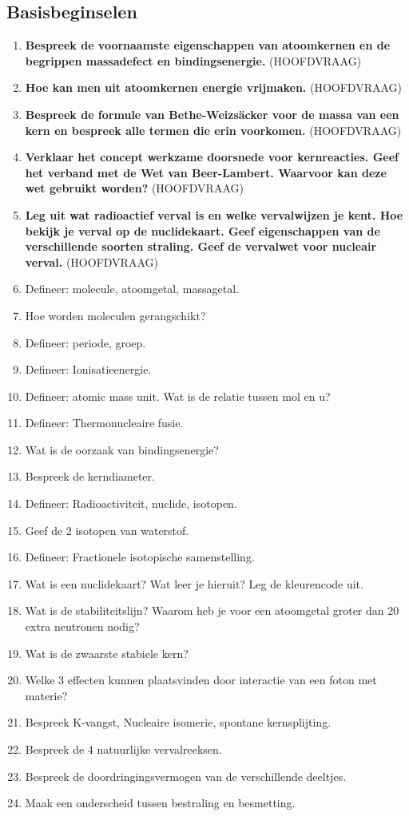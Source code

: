 \documentclass[a4paper,12pt]{article}
\begin{document}
    \subsection{Basisbeginselen}
    \begin{enumerate}
        \item \textbf{Bespreek de voornaamste eigenschappen van atoomkernen en de begrippen massadefect en bindingsenergie.} (HOOFDVRAAG)
        \item \textbf{Hoe kan men uit atoomkernen energie vrijmaken.} (HOOFDVRAAG)
        \item \textbf{Bespreek de formule van Bethe-Weizsäcker voor de massa van een kern en bespreek alle termen die erin voorkomen.} (HOOFDVRAAG)
        \item \textbf{Verklaar het concept werkzame doorsnede voor kernreacties. Geef het verband met de Wet van Beer-Lambert. Waarvoor kan deze wet gebruikt worden?} (HOOFDVRAAG)
        \item \textbf{Leg uit wat radioactief verval is en welke vervalwijzen je kent. Hoe bekijk je verval op de nuclidekaart. Geef eigenschappen van de verschillende soorten straling. Geef de vervalwet voor nucleair verval.} (HOOFDVRAAG)
        \item Defineer: molecule, atoomgetal, massagetal.
        \item Hoe worden moleculen gerangschikt?
        \item Defineer: periode, groep.
        \item Defineer: Ionisatieenergie.
        \item Defineer: atomic mass unit. Wat is de relatie tussen mol en u?
        \item Defineer: Thermonucleaire fusie.
        \item Wat is de oorzaak van bindingsenergie?
        \item Bespreek de kerndiameter.
        \item Defineer: Radioactiviteit, nuclide, isotopen.
        \item Geef de 2 isotopen van waterstof.
        \item Defineer: Fractionele isotopische samenstelling.
        \item Wat is een nuclidekaart? Wat leer je hieruit? Leg de kleurencode uit.
        \item Wat is de stabiliteitslijn? Waarom heb je voor een atoomgetal groter dan 20 extra neutronen nodig?
        \item Wat is de zwaarste stabiele kern? 
        \item Welke 3 effecten kunnen plaatsvinden door interactie van een foton met materie?
        \item Bespreek K-vangst, Nucleaire isomerie, spontane kernsplijting.
        \item Bespreek de 4 natuurlijke vervalreeksen.
        \item Bespreek de doordringingsvermogen van de verschillende deeltjes.
        \item Maak een onderscheid tussen bestraling en besmetting.
    \end{enumerate}
\end{document}
